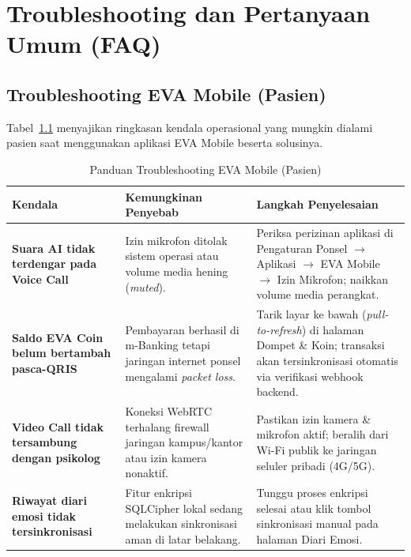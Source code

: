 \chapter{Troubleshooting dan Pertanyaan Umum (FAQ)}
\label{chap:troubleshooting-faq}

\section{Troubleshooting EVA Mobile (Pasien)}
Tabel~\ref{tab:troubleshooting-mobile} menyajikan ringkasan kendala operasional yang mungkin dialami pasien saat menggunakan aplikasi EVA Mobile beserta solusinya.

\begin{table}[htbp]
  \centering
  \caption{Panduan Troubleshooting EVA Mobile (Pasien)}
  \label{tab:troubleshooting-mobile}
  \small
  \begin{tabularx}{\textwidth}{@{}p{4.0cm}p{4.3cm}X@{}}
    \toprule
    \textbf{Kendala} & \textbf{Kemungkinan Penyebab} & \textbf{Langkah Penyelesaian} \\
    \midrule
    \textbf{Suara AI tidak terdengar pada Voice Call} & Izin mikrofon ditolak sistem operasi atau volume media hening (\textit{muted}). & Periksa perizinan aplikasi di Pengaturan Ponsel $\rightarrow$ Aplikasi $\rightarrow$ EVA Mobile $\rightarrow$ Izin Mikrofon; naikkan volume media perangkat. \\
    \addlinespace[4pt]
    \textbf{Saldo EVA Coin belum bertambah pasca-QRIS} & Pembayaran berhasil di m-Banking tetapi jaringan internet ponsel mengalami \textit{packet loss}. & Tarik layar ke bawah (\textit{pull-to-refresh}) di halaman Dompet \& Koin; transaksi akan tersinkronisasi otomatis via verifikasi webhook backend. \\
    \addlinespace[4pt]
    \textbf{Video Call tidak tersambung dengan psikolog} & Koneksi WebRTC terhalang firewall jaringan kampus/kantor atau izin kamera nonaktif. & Pastikan izin kamera \& mikrofon aktif; beralih dari Wi-Fi publik ke jaringan seluler pribadi (4G/5G). \\
    \addlinespace[4pt]
    \textbf{Riwayat diari emosi tidak tersinkronisasi} & Fitur enkripsi SQLCipher lokal sedang melakukan sinkronisasi aman di latar belakang. & Tunggu proses enkripsi selesai atau klik tombol sinkronisasi manual pada halaman Diari Emosi. \\
    \bottomrule
  \end{tabularx}
\end{table}

